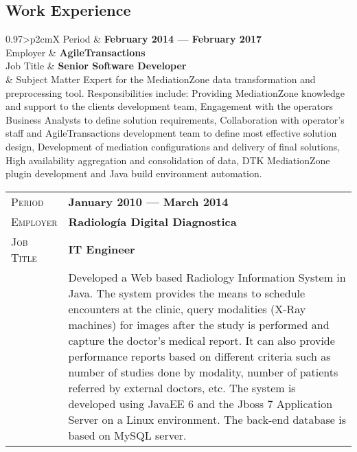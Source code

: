 \documentclass[letter, oneside, final]{scrartcl} %
\newcommand{\gray}{\rowcolor[gray]{.90}} %
\begin{document}
\begin{center}

\section{Work Experience}

\begin{tabularx}{0.97\linewidth}{>{\raggedleft\scshape}p{2cm}X}
	\gray Period & \textbf{February 2014 --- February 2017}\\
	\gray Employer & \textbf{AgileTransactions}\\
	\gray Job Title & \textbf{Senior Software Developer}\\
	& Subject Matter Expert for the MediationZone data transformation and preprocessing tool. Responsibilities include: Providing MediationZone knowledge and support to the clients development team, Engagement with the operators Business Analysts to define solution requirements, Collaboration with operator’s staff and AgileTransactions development team to define most effective solution design, Development of mediation configurations and delivery of final solutions, High availability aggregation and consolidation of data, DTK MediationZone plugin development and Java build environment automation.
\end{tabularx}

\begin{tabularx}{0.97\linewidth}{>{\raggedleft\scshape}p{2cm}X}
\gray Period & \textbf{January 2010 --- March 2014}\\
\gray Employer & \textbf{Radiología Digital Diagnostica}\\
\gray Job Title & \textbf{IT Engineer}\\
& Developed a Web based Radiology Information System in Java. The system provides the means to schedule encounters at the clinic, query modalities (X-Ray machines) for images after the study is performed and capture the doctor's medical report. It can also provide performance reports based on different criteria such as number of studies done by modality, number of patients referred by external doctors, etc. The system is developed using JavaEE 6 and the Jboss 7 Application Server on a Linux environment. The back-end database is based on MySQL server.
\end{tabularx}

\vspace{12pt}


\end{center}
\end{document}
